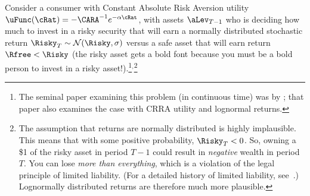 
Consider a consumer with Constant Absolute Risk Aversion
utility
$\uFunc(\cRat) = -\CARA^{-1} e^{-\alpha \cRat_{}}$, with assets
$\aLev_{T-1}$ who is deciding how much to invest in a risky security that
will earn a normally distributed stochastic return $\Risky_{T} \sim
\mathcal{N}(\Risky,\sigma)$ versus a safe asset that will earn return
$\Rfree < \Risky$ (the risky asset gets a bold font because you must be a bold person to invest in a risky asset!).\footnote{The seminal paper examining this problem (in
  continuous time) was by \cite{merton:restat}; that paper also
  examines the case with CRRA utility and lognormal
  returns.}$^{,}$\footnote{The assumption that returns are normally
  distributed is highly implausible.  This means that with some
  positive probability, $\Risky_{T} < 0$.  So, owning a \$1 of the
  risky asset in period $T-1$ could result in {\it negative} wealth in
  period $T$.  You can lose {\it more than everything}, which is a
  violation of the legal principle of limited liability.  (For a
  detailed history of limited liability,
  see~\cite{micklethwaitWooldridgeCompany}.)  Lognormally distributed
  returns are therefore much more plausible.}

